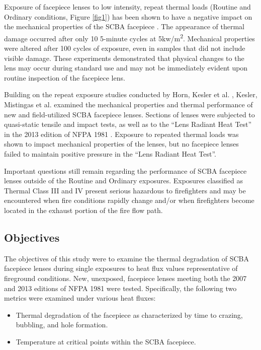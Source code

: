 \documentclass[sn-mathphys]{sn-jnl}%
\theoremstyle{thmstyleone}%
\theoremstyle{thmstyletwo}%
\theoremstyle{thmstylethree}%
\begin{document}
Exposure of facepiece lenses to low intensity, repeat thermal loads (Routine and Ordinary conditions, Figure \ref{fig1}) has been shown to have a negative impact on the mechanical properties of the SCBA facepiece \cite{horn_study_2017}. The appearance of thermal damage occurred after only 10 5-minute cycles at 5kw/m\textsuperscript{2}. Mechanical properties were altered after 100 cycles of exposure, even in samples that did not include visible damage.  These experiments demonstrated that physical changes to the lens may occur during standard use and may not be immediately evident upon routine inspection of the facepiece lens. 

Building on the repeat exposure studies conducted by Horn, Kesler et al. \cite{horn_study_2017}, Kesler, Mistingas et al. \cite{kesler_mechanical_2018} examined the mechanical properties and thermal performance of new and field-utilized SCBA facepiece lenses. Sections of lenses were subjected to quasi-static tensile and impact tests, as well as to the “Lens Radiant Heat Test” in the 2013 edition of NFPA 1981 \cite{national_fire_protection_association_nfpa_2013}. Exposure to repeated thermal loads was shown to impact mechanical properties of the lenses, but no facepiece lenses failed to maintain positive pressure in the “Lens Radiant Heat Test”.  

Important questions still remain regarding the performance of SCBA facepiece lenses outside of the Routine and Ordinary exposures. Exposures classified as Thermal Class III and IV present serious hazardous to firefighters and may be encountered when fire conditions rapidly change and/or when firefighters become located in the exhaust portion of the fire flow path.

\subsection{Objectives}
The objectives of this study were to examine the thermal degradation of SCBA facepiece lenses during single exposures to heat flux values representative of fireground conditions. New, unexposed, facepiece lenses meeting both the 2007 and 2013 editions of NFPA 1981 were tested. Specifically, the following two metrics were examined under various heat fluxes:

\begin{itemize}
    \item{Thermal degradation of the facepiece as characterized by time to crazing, bubbling, and hole formation.}
    \item{Temperature at critical points within the SCBA facepiece.}
\end{itemize}
\end{document}
